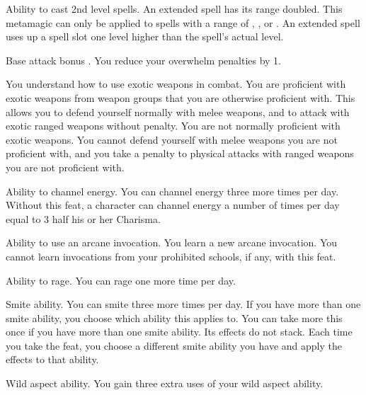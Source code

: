  Ability to cast 2nd level spells.
 An extended spell has its range doubled. This metamagic can only be applied to spells with a range of \rngclose, \rngmed, or \rnglong. An extended spell uses up a spell slot one level higher than the spell's actual level.

 Base attack bonus .
 You reduce your overwhelm penalties by 1.

You understand how to use exotic weapons in combat.
 You are proficient with exotic weapons from weapon groups that you are otherwise proficient with. This allows you to defend yourself normally with melee weapons, and to attack with exotic ranged weapons without penalty.
 You are not normally proficient with exotic weapons. You cannot defend yourself with melee weapons you are not proficient with, and you take a  penalty to physical attacks with ranged weapons you are not proficient with.

 Ability to channel energy.
 You can channel energy three more times per day.
 Without this feat, a character can channel energy a number of times per day equal to 3 \add half his or her Charisma.

 Ability to use an arcane invocation.
 You learn a new arcane invocation. You cannot learn invocations from your prohibited schools, if any, with this feat.

 Ability to rage.
 You can rage one more time per day.

 Smite ability.
 You can smite three more times per day. If you have more than one smite ability, you choose which ability this applies to.
 You can take more this once if you have more than one smite ability. Its effects do not stack. Each time you take the feat, you choose a different smite ability you have and apply the effects to that ability.

 Wild aspect ability.
 You gain three extra uses of your wild aspect ability.


